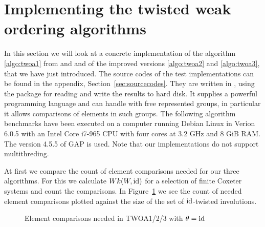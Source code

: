 \section{Implementing the twisted weak ordering algorithms}
\label{sec:implementing-twisted-involutions-algorithms}

In this section we will look at a concrete implementation of the algorithm \ref{algo:twoa1} from \cite{brennemann:twoa} and \cite{haas:twoa} and of the improved versions \ref{algo:twoa2} and \ref{algo:twoa3}, that we have just introduced. The source codes of the test implementations can be found in the appendix, Section~\ref{sec:sourcecodes}. They are written in \cite{gap}, using the \cite{gap:io} package for reading and write the results to hard disk. It supplies a powerful programming language and can handle with free represented groups, in particular it allows comparisons of elements in such groups. The following algorithm benchmarks have been executed on a computer running Debian Linux in Verion 6.0.5 with an Intel\textsuperscript{\textregistered} Core\textsuperscript{\texttrademark} i7-965 CPU with four cores at 3.2 GHz and 8 GiB RAM. The version 4.5.5 of GAP is used. Note that our implementations do not support multithreding.

At first we compare the count of element comparisons needed for our three algorithms. For this we calculate $Wk(W,\operatorname{id})$ for a selection of finite Coxeter systems and count the comparisons. In Figure~\ref{fig:twoa123-element-comparisons} we see the count of needed element comparisons plotted against the size of the set of $\operatorname{id}$-twisted involutions.

\begin{figure}[ht]
	\centering
	\caption{Element comparisons needed in TWOA1/2/3 with $\theta = \operatorname{id}$}
	\label{fig:twoa123-element-comparisons}
\end{figure}

